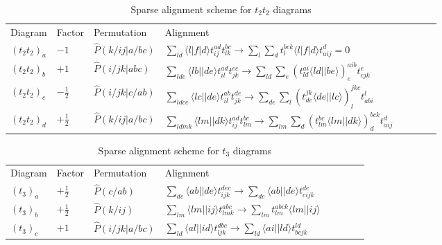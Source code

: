 \begin{table}[]
\centering
\caption{Sparse alignment scheme for $t_2 t_2$ diagrams}
\label{tab:sparse_alignments_t2t2}
\begin{tabular}{llllllll}
Diagram  & Factor & Permutation & Alignment   \\
$(t_2 t_2)_a$&$-1$&$\hat{P}(k/ij \vert a/bc)$&$  \sum_{ld} \langle l \vert f \vert d \rangle t^{a d}_{i j}t^{b c}_{l k}  \rightarrow  \sum_{l} \sum_{d} t^{bck}_{l} \langle l\vert f \vert d\rangle t^{d}_{aij} = 0$ \\
$(t_2 t_2)_b$&$+1$&$\hat{P}(i/jk \vert abc)$&$  \sum_{lde} \langle l b \vert \vert d e \rangle t^{a d}_{i l}t^{e c}_{j k}  \rightarrow  \sum_{ld} \sum_{e} (t^{ai}_{ld} \langle ld\vert \vert be\rangle)^{aib}_e t^{e}_{cjk}  $\\
$(t_2 t_2)_c$&$-\frac{1}{2}$&$\hat{P}(i/jk \vert c/ab)$&$  \sum_{ldce} \langle l c \vert \vert d e \rangle t^{a b}_{i l}t^{d e}_{j k}  \rightarrow  \sum_{de} \sum_{l} (t^{jk}_{de} \langle de\vert \vert lc\rangle)^{jkc}_l t^{l}_{abi} $ \\
$(t_2 t_2)_d$&$+\frac{1}{2}$&$\hat{P}(k/ij \vert a/bc)$&$  \sum_{ldmk} \langle l m \vert \vert d k \rangle t^{a d}_{i j}t^{b c}_{l m}  \rightarrow  \sum_{lm} \sum_{d} (t^{bc}_{lm} \langle lm\vert \vert dk\rangle)^{bck}_d t^{d}_{aij} $ \\
\end{tabular}
\end{table}



\begin{table}[]
\centering
\caption{Sparse alignment scheme for $t_3$ diagrams}
\label{tab:sparse_alignments_t3}
\begin{tabular}{llllllll}
Diagram  & Factor & Permutation & Alignment  \\
$(t_3)_a$ & $+\frac{1}{2}$ & $\hat{P}(c/ab)$ & $\sum_{de} \langle ab \vert \vert de \rangle t^{dec}_{ijk} \rightarrow \sum_{de} \langle ab \vert \vert de \rangle t^{de}_{cijk}$  \\
$(t_3)_b$&$+\frac{1}{2}$& $\hat{P}(k/ij)$& $\sum_{lm} \langle lm \vert \vert ij \rangle t^{abc}_{lmk} \rightarrow \sum_{lm} t^{abck}_{lm} \langle lm \vert \vert ij \rangle $ \\
$(t_3)_c$&$+1$& $\hat{P}(i/jk \vert a/bc)$ & $\sum_{ld} \langle al \vert \vert id \rangle t^{dbc}_{ljk} \rightarrow \sum_{ld} \langle ai \vert \vert ld \rangle t^{ld}_{bcjk}$ \\
\end{tabular}
\end{table}

